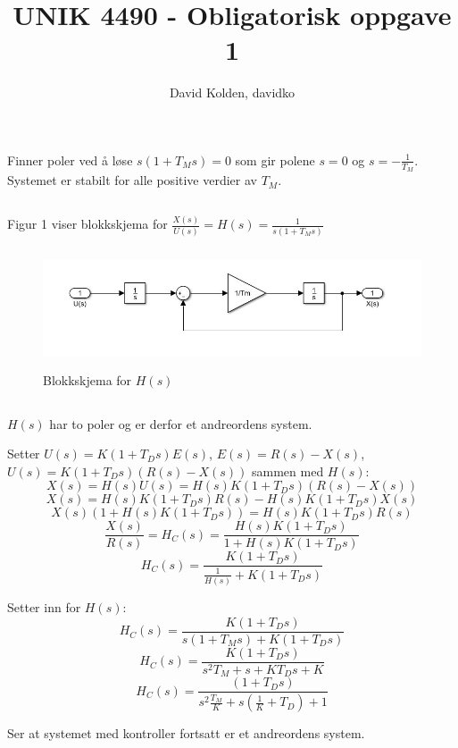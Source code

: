 \documentclass[norsk]{article}
\author{David Kolden, davidko}
\title{UNIK 4490 - Obligatorisk oppgave 1}
\begin{document}
\maketitle
\section{}

\subsection{ }
Finner poler ved å løse \(s(1 + T_Ms) = 0\) som gir polene \(s = 0\) og \(s = -\frac{1}{T_M}\). Systemet er stabilt for alle positive verdier av \(T_M\).

\subsection{ }
Figur 1 viser blokkskjema for \(\frac{X(s)}{U(s)} = H(s) = \frac{1}{s(1 + T_Ms)}\)
\begin{figure}[!htb]
\includegraphics[height=3.5cm]{illustrations/oppg1b_illu}
\caption{Blokkskjema for \(H(s)\)}
\end{figure}

\subsection{ }
\(H(s)\) har to poler og er derfor et andreordens system.

Setter \(U(s) = K(1 + T_Ds)E(s)\), \(E(s) = R(s) - X(s)\), \(U(s) = K(1 + T_Ds)(R(s) - X(s))\) sammen med \(H(s)\):
\[X(s) = H(s)U(s) = H(s)K(1+T_Ds)(R(s) - X(s))\] 
\[X(s) = H(s)K(1+T_Ds)R(s) - H(s)K(1+T_Ds)X(s)\]
\[X(s)(1 + H(s)K(1+T_Ds)) = H(s)K(1+T_Ds)R(s)\]
\[\frac{X(s)}{R(s)} = H_C(s) = \frac{H(s)K(1+T_Ds)}{1+H(s)K(1+T_Ds)}\]
\[H_C(s) = \frac{K(1+T_Ds)}{\frac{1}{H(s)} + K(1+T_Ds)}\]

Setter inn for \(H(s)\):
\[H_C(s) = \frac{K(1+T_Ds)}{s(1+T_Ms)+ K(1+T_Ds)}\]
\[H_C(s) = \frac{K(1+T_Ds)}{s^2T_M + s + KT_Ds + K}\]
\[H_C(s) = \frac{(1+T_Ds)}{s^2\frac{T_M}{K} + s(\frac{1}{K}+T_D) + 1}\]

Ser at systemet med kontroller fortsatt er et andreordens system.
\end{document}
